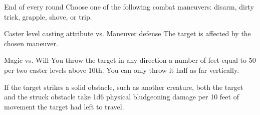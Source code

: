 \begin{spellheader}
    \spellrng{\rngmed}
\end{spellheader}
\begin{spelleffects}
    \begin{spelltrigger}{End of every round}
        \spellspecial Choose one of the following combat maneuvers: disarm, dirty trick, grapple, shove, or trip.
        \begin{spellattack}{Caster level \add casting attribute vs. Maneuver defense}
            \spellsuccess The target is affected by the chosen maneuver.
        \end{spellattack}
    \end{spelltrigger}
\end{spelleffects}
\begin{spellfooter}

\end{spellfooter}

\begin{spellheader}
\end{spellheader}
\begin{spelleffects}
    \begin{spellattack}{Magic vs. Will}
        \spellsuccess You throw the target in any direction a number of feet equal to 50  per two caster levels above 10th. You can only throw it half as far vertically.

        If the target strikes a solid obstacle, such as another creature, both the target and the struck obstacle take 1d6 physical bludgeoning damage per 10 feet of movement the target had left to travel.
    \end{spellattack}
\end{spelleffects}
\begin{spellfooter}

\end{spellfooter}

